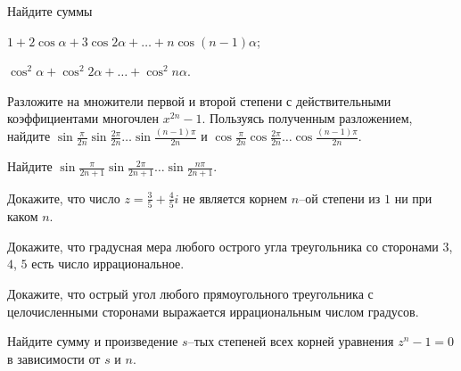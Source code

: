 \documentclass[a4paper, 12pt, num=22]{listok}
\begin{document}
\begin{problem}
	Найдите суммы
	\begin{multienum}{2}
		\item $1 + 2 \cos \alpha + 3 \cos{2\alpha} + \ldots + n \cos{(n−1)\alpha}$;
		\item $\cos^2 \alpha + \cos^2 {2\alpha} + \ldots + \cos^2 {n\alpha}$.
	\end{multienum}
\end{problem}
\begin{problem}
\begin{probparts}
	\item Разложите на множители первой и второй степени с действительными коэффициентами многочлен $x^{2n} - 1$.
	Пользуясь полученным разложением, найдите $\sin{\frac{\pi}{2n}}\sin{\frac{2\pi}{2n}}\ldots\sin{\frac{(n - 1)\pi}{2n}}$ и
	$\cos{\frac{\pi}{2n}}\cos{\frac{2\pi}{2n}}\ldots\cos{\frac{(n - 1)\pi}{2n}}$.
	\item Найдите $\sin{\frac{\pi}{2n + 1}}\sin{\frac{2\pi}{2n + 1}}\ldots\sin{\frac{n\pi}{2n + 1}}$.
\end{probparts}
\end{problem}
\begin{problem}
\begin{probparts}
	\item Докажите, что число $z = \frac35 + \frac45 i$ не является корнем $n$--ой степени из $1$ ни при каком $n$.
	\item Докажите, что градусная мера любого острого угла треугольника со сторонами $3$, $4$, $5$ есть число иррациональное.
	\item Докажите, что острый угол любого прямоугольного треугольника с целочисленными сторонами выражается иррациональным числом градусов.
\end{probparts}
\end{problem}
\begin{problem}
	Найдите сумму и произведение $s$--тых степеней всех корней уравнения $z^n -1 = 0$ в зависимости от $s$ и $n$.
\end{problem}
\end{document}
